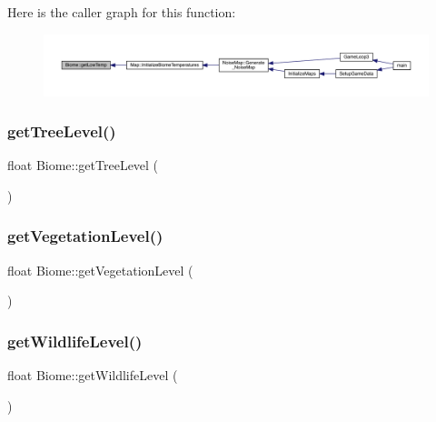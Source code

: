 Here is the caller graph for this function\+:
\nopagebreak
\begin{figure}[H]
\begin{center}
\leavevmode
\includegraphics[width=350pt]{class_biome_a198f0bb873cce52c8e62df2cf0282e84_icgraph}
\end{center}
\end{figure}
\mbox{\label{class_biome_a052e0b1b6a6167f3e076a64a59487172}} 
\subsubsection{\texorpdfstring{get\+Tree\+Level()}{getTreeLevel()}}
{\footnotesize\ttfamily float Biome\+::get\+Tree\+Level (\begin{DoxyParamCaption}{ }\end{DoxyParamCaption})}

\mbox{\label{class_biome_a93767d0c392cdef6c3c527a4dbe38efd}} 
\subsubsection{\texorpdfstring{get\+Vegetation\+Level()}{getVegetationLevel()}}
{\footnotesize\ttfamily float Biome\+::get\+Vegetation\+Level (\begin{DoxyParamCaption}{ }\end{DoxyParamCaption})}

\mbox{\label{class_biome_aaa9ebdc0dde9b6737da890299a7b5ea4}} 
\subsubsection{\texorpdfstring{get\+Wildlife\+Level()}{getWildlifeLevel()}}
{\footnotesize\ttfamily float Biome\+::get\+Wildlife\+Level (\begin{DoxyParamCaption}{ }\end{DoxyParamCaption})}

